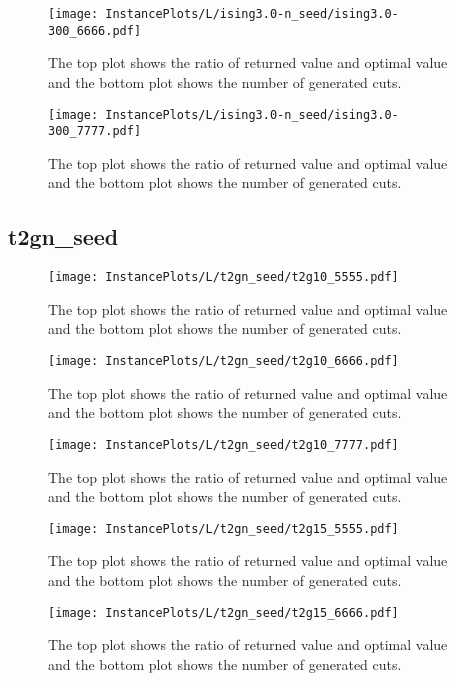 \documentclass[10pt,a4paper]{article}
\begin{document}
\begin{figure}[H]
\texttt{[image: InstancePlots/L/ising3.0-n\_seed/ising3.0-300\_6666.pdf]}
\caption{The top plot shows the ratio of returned value and optimal value     and the bottom plot shows the number of generated cuts.}
\end{figure}

\begin{figure}[H]
\texttt{[image: InstancePlots/L/ising3.0-n\_seed/ising3.0-300\_7777.pdf]}
\caption{The top plot shows the ratio of returned value and optimal value     and the bottom plot shows the number of generated cuts.}
\end{figure}

\subsection{t2gn\_seed}
\begin{figure}[H]
\texttt{[image: InstancePlots/L/t2gn\_seed/t2g10\_5555.pdf]}
\caption{The top plot shows the ratio of returned value and optimal value     and the bottom plot shows the number of generated cuts.}
\end{figure}

\begin{figure}[H]
\texttt{[image: InstancePlots/L/t2gn\_seed/t2g10\_6666.pdf]}
\caption{The top plot shows the ratio of returned value and optimal value     and the bottom plot shows the number of generated cuts.}
\end{figure}

\begin{figure}[H]
\texttt{[image: InstancePlots/L/t2gn\_seed/t2g10\_7777.pdf]}
\caption{The top plot shows the ratio of returned value and optimal value     and the bottom plot shows the number of generated cuts.}
\end{figure}

\begin{figure}[H]
\texttt{[image: InstancePlots/L/t2gn\_seed/t2g15\_5555.pdf]}
\caption{The top plot shows the ratio of returned value and optimal value     and the bottom plot shows the number of generated cuts.}
\end{figure}

\begin{figure}[H]
\texttt{[image: InstancePlots/L/t2gn\_seed/t2g15\_6666.pdf]}
\caption{The top plot shows the ratio of returned value and optimal value     and the bottom plot shows the number of generated cuts.}
\end{figure}
\end{document}
